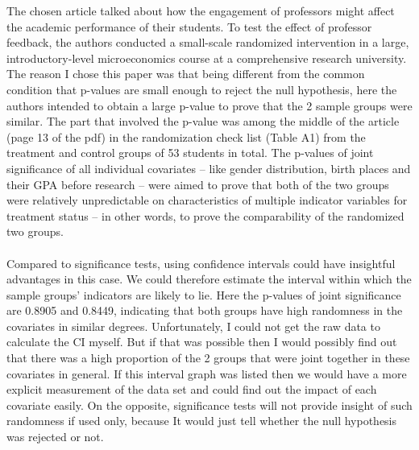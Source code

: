 \documentclass[letterpaper, 12 pt, conference]{article}
\begin{document}
\begin{enumerate}
    The chosen article talked about how the engagement of professors might affect the academic performance of their students. To test the effect of professor feedback, the authors conducted a small-scale randomized intervention in a large, introductory-level microeconomics course at a comprehensive research university. The reason I chose this paper was that being different from the common condition that p-values are small enough to reject the null hypothesis, here the authors intended to obtain a large p-value to prove that the 2 sample groups were similar. The part that involved the p-value was among the middle of the article (page 13 of the pdf) in the randomization check list (Table A1) from the treatment and control groups of 53 students in total. The p-values of joint significance of all individual covariates -- like gender distribution, birth places and their GPA before research -- were aimed to prove that both of the two groups were relatively unpredictable on characteristics of multiple indicator variables for treatment status -- in other words, to prove the comparability of the randomized two groups. 
    \\
    \\  Compared to significance tests, using confidence intervals could have insightful advantages in this case. We could therefore estimate the interval within which the sample groups’ indicators are likely to lie. Here the p-values of joint significance are 0.8905 and 0.8449, indicating that both groups have high randomness in the covariates in similar degrees. Unfortunately, I could not get the raw data to calculate the CI myself. But if that was possible then I would possibly find out that there was a high proportion of the 2 groups that were joint together in these covariates in general. If this interval graph was listed then we would have a more explicit measurement of the data set and could find out the impact of each covariate easily. On the opposite, significance tests will not provide insight of such randomness if used only, because It would just tell whether the null hypothesis was rejected or not.
    \\
    \\

\end{enumerate}
\end{document}
